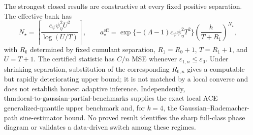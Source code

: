 The strongest closed results are constructive at every fixed positive separation.  The effective bank has
\[
 N_{\star}=\left\lceil\frac{c_{\psi}\psi_{\eta}^2U^2}{\log(U/T)}\right\rceil,\qquad
 a_{\star}^{\mathrm{eff}}
 =\exp\{-(\Lambda-1)c_{\psi}\psi_{\eta}^2T^2\}
 \left(\frac{h}{T+R_1}\right)^{N_{\star}},
\]
with \(R_0\) determined by fixed cumulant separation, \(R_1=R_0+1\), \(T=R_1+1\), and \(U=T+1\).  The certified statistic has \(C/n\) MSE whenever \(\varepsilon_{1,n}\le\varepsilon_0\).  Under shrinking separation, substitution of the corresponding \(R_{0,n}\) gives a computable but rapidly deteriorating upper bound; it is not matched by a local converse and does not establish honest adaptive inference.  Independently, \(\text{thm:local-to-gaussian-partial-benchmarks}\) supplies the exact local ACE generalized-quantile upper benchmark and, for \(k=4\), the Gaussian--Rademacher-path sine-estimator bound.  No proved result identifies the sharp full-class phase diagram or validates a data-driven switch among these regimes.